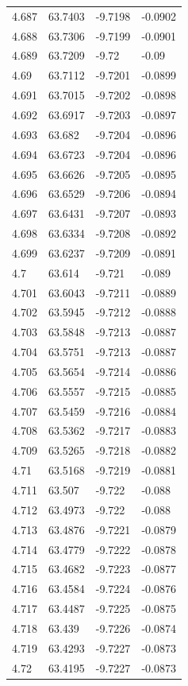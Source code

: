 \begin{tabular}{llll}
4.687 & 63.7403 & -9.7198 & -0.0902 \\
4.688 & 63.7306 & -9.7199 & -0.0901 \\
4.689 & 63.7209 & -9.72 & -0.09 \\
4.69 & 63.7112 & -9.7201 & -0.0899 \\
4.691 & 63.7015 & -9.7202 & -0.0898 \\
4.692 & 63.6917 & -9.7203 & -0.0897 \\
4.693 & 63.682 & -9.7204 & -0.0896 \\
4.694 & 63.6723 & -9.7204 & -0.0896 \\
4.695 & 63.6626 & -9.7205 & -0.0895 \\
4.696 & 63.6529 & -9.7206 & -0.0894 \\
4.697 & 63.6431 & -9.7207 & -0.0893 \\
4.698 & 63.6334 & -9.7208 & -0.0892 \\
4.699 & 63.6237 & -9.7209 & -0.0891 \\
4.7 & 63.614 & -9.721 & -0.089 \\
4.701 & 63.6043 & -9.7211 & -0.0889 \\
4.702 & 63.5945 & -9.7212 & -0.0888 \\
4.703 & 63.5848 & -9.7213 & -0.0887 \\
4.704 & 63.5751 & -9.7213 & -0.0887 \\
4.705 & 63.5654 & -9.7214 & -0.0886 \\
4.706 & 63.5557 & -9.7215 & -0.0885 \\
4.707 & 63.5459 & -9.7216 & -0.0884 \\
4.708 & 63.5362 & -9.7217 & -0.0883 \\
4.709 & 63.5265 & -9.7218 & -0.0882 \\
4.71 & 63.5168 & -9.7219 & -0.0881 \\
4.711 & 63.507 & -9.722 & -0.088 \\
4.712 & 63.4973 & -9.722 & -0.088 \\
4.713 & 63.4876 & -9.7221 & -0.0879 \\
4.714 & 63.4779 & -9.7222 & -0.0878 \\
4.715 & 63.4682 & -9.7223 & -0.0877 \\
4.716 & 63.4584 & -9.7224 & -0.0876 \\
4.717 & 63.4487 & -9.7225 & -0.0875 \\
4.718 & 63.439 & -9.7226 & -0.0874 \\
4.719 & 63.4293 & -9.7227 & -0.0873 \\
4.72 & 63.4195 & -9.7227 & -0.0873 \\

\end{tabular}
